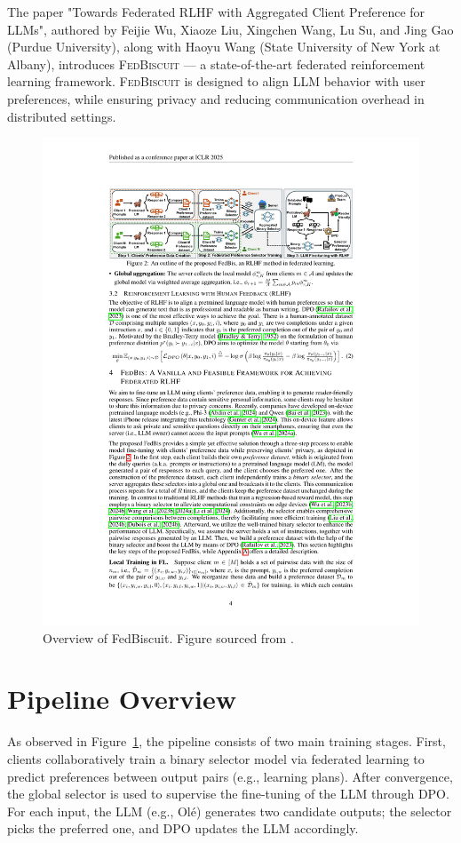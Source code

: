 The paper "Towards Federated RLHF with Aggregated Client Preference for LLMs", authored by Feijie Wu, Xiaoze Liu, Xingchen Wang, Lu Su, and Jing Gao (Purdue University), along with Haoyu Wang (State University of New York at Albany), introduces \textsc{FedBiscuit} — a state-of-the-art federated reinforcement learning framework. \textsc{FedBiscuit} is designed to align LLM behavior with user preferences, while ensuring privacy and reducing communication overhead in distributed settings.

\begin{figure}
	\includegraphics[width=\textwidth]{fedbiscuit-overview.pdf}
  \caption{Overview of FedBiscuit. Figure sourced from \cite{wu2025federatedrlhfaggregatedclient}.}
  \label{fig:overview}
\end{figure}

\section{Pipeline Overview}
As observed in Figure~\ref{fig:overview}, the pipeline consists of two main training stages. First, clients collaboratively train a binary selector model via federated learning to predict preferences between output pairs (e.g., learning plans). After convergence, the global selector is used to supervise the fine-tuning of the LLM through DPO. For each input, the LLM (e.g., Ol\'e) generates two candidate outputs; the selector picks the preferred one, and DPO updates the LLM accordingly. 

